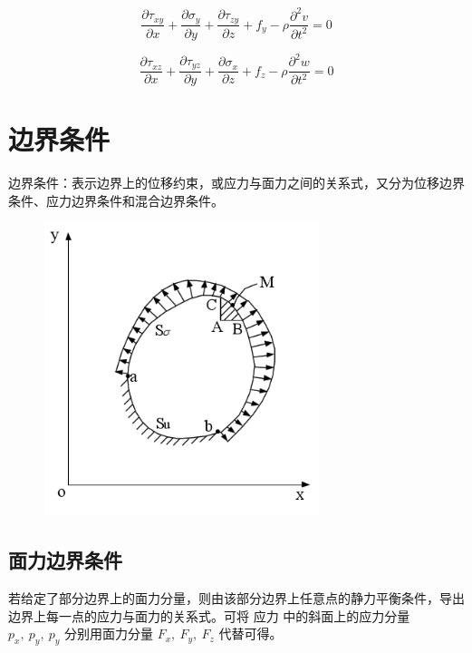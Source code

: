 \documentclass[12pt,a4paper]{article}
\begin{document}
$$
\frac{\partial\tau_{xy}}{\partial x}+\frac{\partial\sigma_{y}}{\partial y}+\frac{\partial\tau_{zy}}{\partial z}+f_y-\rho\frac{\partial ^2 v}{\partial t^2}=0
$$

$$
\frac{\partial\tau_{xz}}{\partial x}+\frac{\partial\tau_{yz}}{\partial y}+\frac{\partial\sigma_{x}}{\partial z}+f_z-\rho\frac{\partial ^2 w}{\partial t^2}=0
$$

\section{边界条件}

边界条件：表示边界上的位移约束，或应力与面力之间的关系式，又分为位移边界条件、应力边界条件和混合边界条件。

\begin{figure}[H]
\centering
\includegraphics[scale=0.4]{./figures/28.png}
\caption{}
\end{figure}

\subsection{面力边界条件}

若给定了部分边界上的面力分量，则由该部分边界上任意点的静力平衡条件，导出边界上每一点的应力与面力的关系式。可将 $\textbf{应力}$ 中的斜面上的应力分量 $p_x, ~ p_y, ~ p_y$ 分别用面力分量 $F_x, ~ F_y, ~ F_z$ 代替可得。
\end{document}
